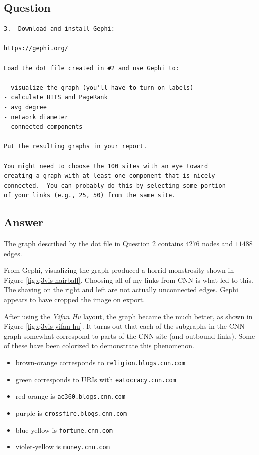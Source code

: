 \documentclass[letterpaper,11pt]{article}
\begin{document}
\subsection*{Question}

\begin{verbatim}
3.  Download and install Gephi:

https://gephi.org/

Load the dot file created in #2 and use Gephi to:

- visualize the graph (you'll have to turn on labels)
- calculate HITS and PageRank
- avg degree
- network diameter
- connected components

Put the resulting graphs in your report.

You might need to choose the 100 sites with an eye toward
creating a graph with at least one component that is nicely
connected.  You can probably do this by selecting some portion
of your links (e.g., 25, 50) from the same site.  
\end{verbatim}

\newpage
\subsection*{Answer}

The graph described by the dot file in Question 2 contains $4276$ nodes and $11488$ edges.

From Gephi, visualizing the graph produced a horrid monstrosity shown in Figure \ref{fig:q3vis-hairball}.  Choosing all of my links from CNN is what led to this.  The shaving on the right and left are not actually unconnected edges.  Gephi appears to have cropped the image on export.

After using the \emph{Yifan Hu} layout, the graph became the much better, as shown in Figure \ref{fig:q3vis-yifan-hu}.  It turns out that each of the subgraphs in the CNN graph somewhat correspond to parts of the CNN site (and outbound links).  Some of these have been colorized to demonstrate this phenomenon.  

\begin{itemize}
\item brown-orange corresponds to \verb+religion.blogs.cnn.com+
\item green corresponds to URIs with \verb+eatocracy.cnn.com+
\item red-orange is \verb+ac360.blogs.cnn.com+
\item purple is \verb+crossfire.blogs.cnn.com+
\item blue-yellow is \verb+fortune.cnn.com+
\item violet-yellow is \verb+money.cnn.com+
\end{itemize}
\end{document}
